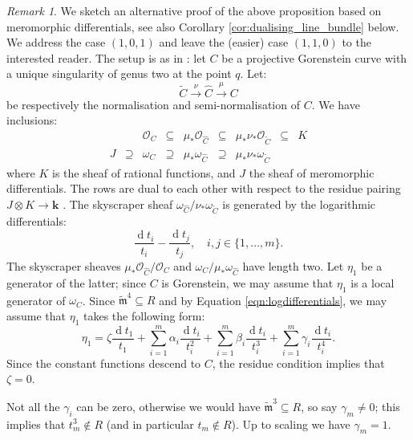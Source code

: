 \documentclass{compositio}
\renewcommand{\k}{\mathbf k}
\newcommand{\tm}{\widetilde{\mathfrak m}}
\newcommand{\OO}{\mathcal O}
\renewcommand{\to}{\rightarrow}
\theoremstyle{plain}
\theoremstyle{definition}
\theoremstyle{remark}
\newtheorem{rem}[thm]{Remark}
\begin{document}
\begin{rem}
 We sketch an alternative proof of the above proposition based on meromorphic differentials, see also Corollary \ref{cor:dualising_line_bundle} below. We address the case $(1,0,1)$ and leave the (easier) case $(1,1,0)$ to the interested reader. The setup is as in \cite[\S 2.1]{RSPW2}: let $C$ be a projective Gorenstein curve with a unique singularity of genus two at the point $q$. Let:
 \[ \widetilde C\xrightarrow{\nu}\widehat C\xrightarrow{\mu} C\]
 be respectively the normalisation and semi-normalisation of $C$. We have inclusions:
 \begin{align*}
  {} & {} & \OO_C & \subseteq & \mu_* \OO_{\widehat C} & \subseteq & \mu_*\nu_* \OO_{\widetilde C} & \subseteq  & K \\
  J  & \supseteq & \omega_C & \supseteq & \mu_* \omega_{\widehat C} & \supseteq & \mu_*\nu_* \omega_{\widetilde C} & {}
 \end{align*}
where $K$ is the sheaf of rational functions, and $J$ the sheaf of meromorphic differentials. The rows are dual to each other with respect to the residue pairing $J\otimes K\to\k$ \cite[Proposition 1.16(ii)]{AK}. The skyscraper sheaf $\omega_{\widehat C}/\nu_* \omega_{\widetilde C}$ is generated by the logarithmic differentials:
\begin{equation}\label{eqn:logdifferentials}\frac{\operatorname{d} t_i}{t_i}-\frac{\operatorname{d} t_j}{t_j},\quad i,j\in\{1,\ldots,m\}.\end{equation}
The skyscraper sheaves $\mu_*\OO_{\widehat C}/\OO_C$ and $\omega_C/\mu_*\omega_{\widehat C}$ have length two. Let $\eta_1$ be a generator of the latter; since $C$ is Gorenstein, we may assume that $\eta_1$ is a local generator of $\omega_C$. Since $\tm^4\subseteq R$ and by Equation \eqref{eqn:logdifferentials}, we may assume that $\eta_1$ takes the following form:
\begin{equation}\label{eqn:eta1}\eta_1=\zeta\frac{\operatorname{d} t_1}{t_1}+\sum_{i=1}^m \alpha_i \frac{\operatorname{d} t_i}{t_i^2}+ \sum_{i=1}^m \beta_i \frac{\operatorname{d} t_i}{t_i^3}+ \sum_{i=1}^m \gamma_i \frac{\operatorname{d} t_i}{t_i^4}.\end{equation}
Since the constant functions descend to $C$, the residue condition implies that $\zeta=0$. 

Not all the $\gamma_i$ can be zero, otherwise we would have $\tm^3\subseteq R$, so say $\gamma_m\neq 0$; this implies that $t_m^3\notin R$ (and in particular $t_m\notin R$). Up to scaling we have $\gamma_m=1$.


\end{rem}
\end{document}
